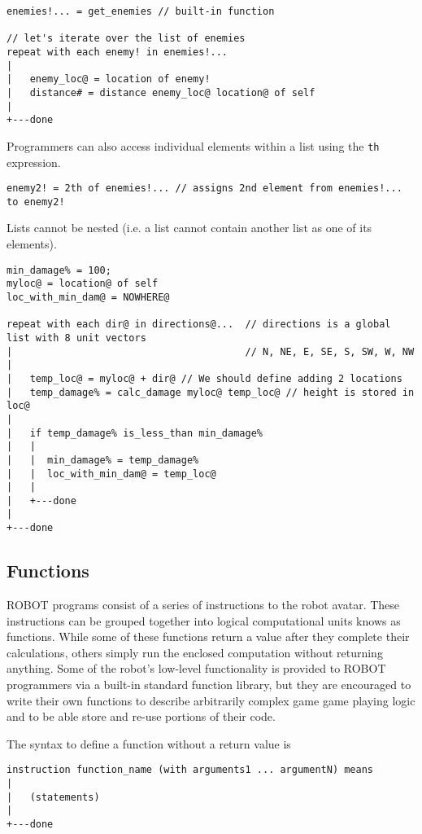 \documentclass[a4paper]{article}
\begin{document}
\begin{verbatim}
enemies!... = get_enemies // built-in function

// let's iterate over the list of enemies
repeat with each enemy! in enemies!...
|
|   enemy_loc@ = location of enemy!
|   distance# = distance enemy_loc@ location@ of self
|
+---done
\end{verbatim}

Programmers can also access individual elements within a list using the \texttt{th} expression.

\begin{verbatim}
enemy2! = 2th of enemies!... // assigns 2nd element from enemies!... to enemy2!
\end{verbatim}

Lists cannot be nested (i.e. a list cannot contain another list as one of its elements).

\begin{verbatim}
min_damage% = 100;
myloc@ = location@ of self
loc_with_min_dam@ = NOWHERE@

repeat with each dir@ in directions@...  // directions is a global list with 8 unit vectors
|                                        // N, NE, E, SE, S, SW, W, NW 
|
|   temp_loc@ = myloc@ + dir@ // We should define adding 2 locations
|   temp_damage% = calc_damage myloc@ temp_loc@ // height is stored in loc@
|
|   if temp_damage% is_less_than min_damage%
|   |
|   |  min_damage% = temp_damage%
|   |  loc_with_min_dam@ = temp_loc@
|   |
|   +---done
|  
+---done
\end{verbatim}

\subsection{Functions}

ROBOT programs consist of a series of instructions to the robot avatar.  These instructions can be grouped together into logical computational units knows as functions.  While some of these functions return a value after they complete their calculations, others simply run the enclosed computation without returning anything.  Some of the robot's low-level functionality is provided to ROBOT programmers via a built-in standard function library, but they are encouraged to write their own functions to describe arbitrarily complex game game playing logic and to be able store and re-use portions of their code.

The syntax to define a function without a return value is
\begin{verbatim}
instruction function_name (with arguments1 ... argumentN) means
|  
|   (statements)
|
+---done
\end{verbatim}
\end{document}
